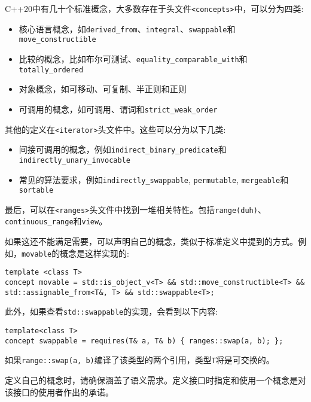 C++20中有几十个标准概念，大多数存在于头文件\texttt{<concepts>}中，可以分为四类:

\begin{itemize}
\item 
核心语言概念，如\texttt{derived\_from}、\texttt{integral}、\texttt{swappable}和\texttt{move\_constructible}

\item 
比较的概念，比如布尔可测试、\texttt{equality\_comparable\_with}和\texttt{totally\_ordered}

\item 
对象概念，如可移动、可复制、半正则和正则

\item 
可调用的概念，如可调用、谓词和\texttt{strict\_weak\_order}
\end{itemize}

其他的定义在\texttt{<iterator>}头文件中。这些可以分为以下几类:

\begin{itemize}
\item 
间接可调用的概念，例如\texttt{indirect\_binary\_predicate}和\texttt{indirectly\_unary\_invocable}

\item 
常见的算法要求，例如\texttt{indirectly\_swappable}, \texttt{permutable}, \texttt{mergeable}和\texttt{sortable}
\end{itemize}

最后，可以在\texttt{<ranges>}头文件中找到一堆相关特性。包括\texttt{range(duh)}、\texttt{continuous\_range}和\texttt{view}。

如果这还不能满足需要，可以声明自己的概念，类似于标准定义中提到的方式。例如，\texttt{movable}的概念是这样实现的:

\begin{lstlisting}[style=styleCXX]
template <class T>
concept movable = std::is_object_v<T> && std::move_constructible<T> &&
std::assignable_from<T&, T> && std::swappable<T>;
\end{lstlisting}

此外，如果查看\texttt{std::swappable}的实现，会看到以下内容:

\begin{lstlisting}[style=styleCXX]
template<class T>
concept swappable = requires(T& a, T& b) { ranges::swap(a, b); };
\end{lstlisting}

如果\texttt{range::swap(a, b)}编译了该类型的两个引用，类型\texttt{T}将是可交换的。

\begin{tcolorbox}[colback=webgreen!5!white,colframe=webgreen!75!black, title=TIP]
\hspace*{0.7cm}定义自己的概念时，请确保涵盖了语义需求。定义接口时指定和使用一个概念是对该接口的使用者作出的承诺。
\end{tcolorbox}

